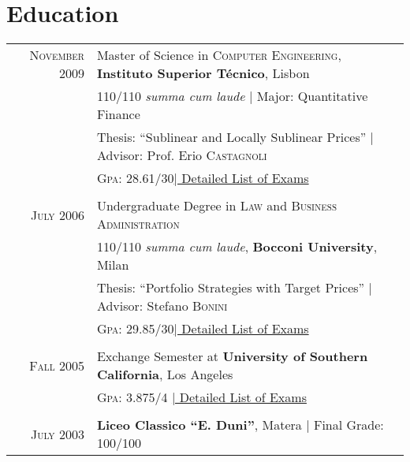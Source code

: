 \documentclass[a4paper,10pt]{article}
\begin{document}
  
  \section{Education}
  \begin{tabular}{rl}	
   \textsc{November} 2009 & Master of Science in \textsc{Computer Engineering}, \textbf{Instituto Superior Técnico}, Lisbon\\
  & 110/110 \small\emph{summa cum laude} | Major: Quantitative Finance\\
  & Thesis: ``Sublinear and Locally Sublinear Prices'' | \small Advisor: Prof. Erio \textsc{Castagnoli}\\
  &\normalsize \textsc{Gpa}: 28.61/30\hyperlink{grds}{\hfill | \footnotesize Detailed List of Exams}\\&\\
  \textsc{July} 2006& Undergraduate Degree in \textsc{Law} and \textsc{Business Administration} \\&110/110 \small\emph{summa cum laude}, \normalsize\textbf{Bocconi University}, Milan\\
  & Thesis: ``Portfolio Strategies with Target Prices'' | \small Advisor: Stefano \textsc{Bonini}\\
  &\normalsize \textsc{Gpa}: 29.85/30\hyperlink{grds_cleli}{\hfill| \footnotesize Detailed List of Exams}\\&\\
  \textsc{Fall} 2005& Exchange Semester at \textbf{University of Southern California}, Los Angeles\\
  &\textsc{Gpa}: 3.875/4 \hyperlink{grds_usc}{\hfill| \footnotesize Detailed List of Exams}\\&\\
  \textsc{July} 2003& \textbf{Liceo Classico ``E. Duni''}, Matera | Final Grade: 100/100
  \end{tabular}
\end{document}
